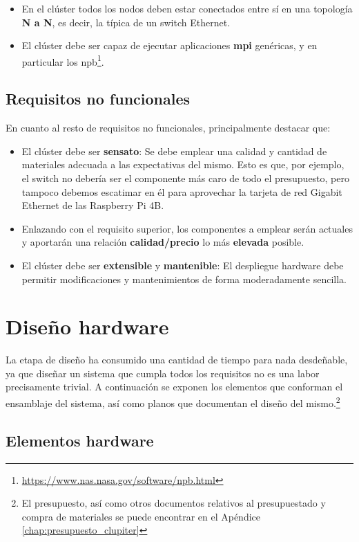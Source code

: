 \begin{itemize}
    \item En el clúster todos los nodos deben estar conectados entre sí en una topología \textbf{N a N}, es decir, la típica de un switch Ethernet.
    \item El clúster debe ser capaz de ejecutar aplicaciones \textbf{\acrshort{mpi}} genéricas, y en particular los \acrlong{npb}\footnote{\url{https://www.nas.nasa.gov/software/npb.html}}.
\end{itemize}

\subsection{Requisitos no funcionales}
En cuanto al resto de requisitos no funcionales, principalmente destacar que:
\begin{itemize}
    \item El clúster debe ser \textbf{sensato}: Se debe emplear una calidad y cantidad de materiales adecuada a las expectativas del mismo. Esto es que, por ejemplo, el switch no debería ser el componente más caro de todo el presupuesto, pero tampoco debemos escatimar en él para aprovechar la tarjeta de red Gigabit Ethernet de las Raspberry Pi 4B.
    \item Enlazando con el requisito superior, los componentes a emplear serán actuales y aportarán una relación \textbf{calidad/precio} lo más \textbf{elevada} posible.
    \item El clúster debe ser \textbf{extensible} y \textbf{mantenible}: El despliegue hardware debe permitir modificaciones y mantenimientos de forma moderadamente sencilla.
\end{itemize}

\section{Diseño hardware}
\label{sec:diseño_hardware}
La etapa de diseño ha consumido una cantidad de tiempo para nada desdeñable, ya que diseñar un sistema que cumpla todos los requisitos no es una labor precisamente trivial. A continuación se exponen los elementos que conforman el ensamblaje del sistema, así como planos que documentan el diseño del mismo.\footnote{El presupuesto, así como otros documentos relativos al presupuestado y compra de materiales se puede encontrar en el Apéndice \ref{chap:presupuesto_clupiter}}

\subsection{Elementos hardware}

